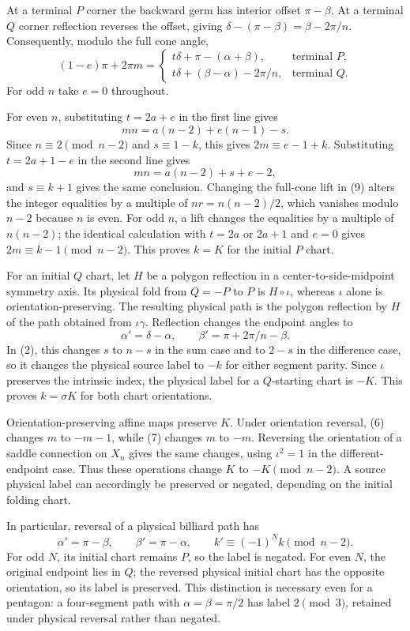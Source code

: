 \documentclass[11pt]{article}
\begin{document}
At a terminal \(P\) corner the backward germ has interior offset \(\pi-\beta\). At a terminal \(Q\) corner reflection reverses the offset, giving
\(\delta-(\pi-\beta)=\beta-2\pi/n\).
Consequently, modulo the full cone angle,
\[
(1-e)\pi+2\pi m=
\begin{cases}
t\delta+\pi-(\alpha+\beta),&\text{terminal }P,\\
t\delta+(\beta-\alpha)-2\pi/n,&\text{terminal }Q.
\end{cases}
\tag{9}
\]
For odd \(n\) take \(e=0\) throughout.

For even \(n\), substituting \(t=2a+e\) in the first line gives
\[
mn=a(n-2)+e(n-1)-s.
\]
Since \(n\equiv2\pmod{n-2}\) and \(s\equiv1-k\), this gives \(2m\equiv e-1+k\). Substituting \(t=2a+1-e\) in the second line gives
\[
mn=a(n-2)+s+e-2,
\]
and \(s\equiv k+1\) gives the same conclusion. Changing the full-cone lift in (9) alters the integer equalities by a multiple of \(nr=n(n-2)/2\), which vanishes modulo \(n-2\) because \(n\) is even. For odd \(n\), a lift changes the equalities by a multiple of \(n(n-2)\); the identical calculation with \(t=2a\) or \(2a+1\) and \(e=0\) gives \(2m\equiv k-1\pmod{n-2}\). This proves \(k=K\) for the initial \(P\) chart.

For an initial \(Q\) chart, let \(H\) be a polygon reflection in a center-to-side-midpoint symmetry axis. Its physical fold from \(Q=-P\) to \(P\) is \(H\circ\iota\), whereas \(\iota\) alone is orientation-preserving. The resulting physical path is the polygon reflection by \(H\) of the path obtained from \(\iota\gamma\). Reflection changes the endpoint angles to
\[
\alpha'=\delta-\alpha,\qquad
\beta'=\pi+2\pi/n-\beta.
\]
In (2), this changes \(s\) to \(n-s\) in the sum case and to \(2-s\) in the difference case, so it changes the physical source label to \(-k\) for either segment parity. Since \(\iota\) preserves the intrinsic index, the physical label for a \(Q\)-starting chart is \(-K\). This proves \(k=\sigma K\) for both chart orientations.

Orientation-preserving affine maps preserve \(K\). Under orientation reversal, (6) changes \(m\) to \(-m-1\), while (7) changes \(m\) to \(-m\). Reversing the orientation of a saddle connection on \(X_n\) gives the same changes, using \(\iota^2=1\) in the different-endpoint case. Thus these operations change \(K\) to \(-K\pmod{n-2}\). A source physical label can accordingly be preserved or negated, depending on the initial folding chart.

In particular, reversal of a physical billiard path has
\[
\alpha'=\pi-\beta,\qquad\beta'=\pi-\alpha,\qquad
k'\equiv(-1)^N k\pmod{n-2}.
\]
For odd \(N\), its initial chart remains \(P\), so the label is negated. For even \(N\), the original endpoint lies in \(Q\); the reversed physical initial chart has the opposite orientation, so its label is preserved. This distinction is necessary even for a pentagon: a four-segment path with \(\alpha=\beta=\pi/2\) has label \(2\pmod3\), retained under physical reversal rather than negated.
\end{document}
